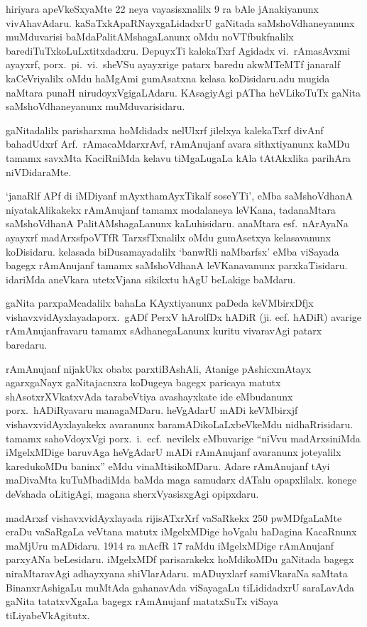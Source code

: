 hiriyara apeVkeSxyaMte {\rm 22} neya vayasisxnalilx {\rm 9} ra bAle jAnakiyanunx vivAha\-vAdaru. kaSaTxkApaRNayxgaLidadxrU gaNitada saMshoVdhaneyanunx muMduvarisi baMda\break PalitAMshagaLanunx oMdu noVTfbukfnalilx  barediTuTxkoLuLxtitxdadxru. DepuyxTi kalekaTxrf Agidadx vi.~rAmasAvxmi ayayxrf, porx.~pi.~vi.~sheVSu ayayxrige patarx baredu akwMTeMTf janaralf kaCeVriyalilx oMdu haMgAmi gumAsatxna kelasa koDisidaru.\break adu mugida naMtara punaH nirudoyxVgigaLAdaru. KAsagiyAgi pATha heVLikoTuTx gaNita saMshoVdhaneyanunx muMduvarisidaru.

gaNitadalilx parisharxma hoMdidadx nelUlxrf jilelxya kalekaTxrf divAnf bahadUdxrf\break 
Arf.~rAmacaMdarxrAvf, rAmAnujanf avara sithxtiyanunx kaMDu tamamx savxMta KaciRniMda kelavu tiMgaLugaLa kAla tAtAkxlika parihAra niVDidaraMte.

`janaRlf APf di iMDiyanf mAyxthamAyxTikalf soseYTi', eMba saMshoVdhanA niyatakAlikakekx rAmAnujanf tamamx modalaneya leVKana, tadanaMtara saMshoVdhanA PalitAMshagaLanunx kaLuhisidaru. anaMtara esf.~nArAyaNa ayayxrf madArxsf\break poVTfR TarxsfTxnalilx oMdu gumAsetxya kelasavanunx koDisidaru. kelasada biDusamaya\-dalilx `banwRli naMbarfsx' eMba viSayada bagegx rAmAnujanf tamamx saMshoVdhanA leVKanavanunx parxkaTisidaru. idariMda aneVkara utetxVjana sikikxtu hAgU beLakige baMdaru.

gaNita parxpaMcadalilx bahaLa KAyxtiyanunx paDeda keVMbirxDfjx vishavxvidAyxlayada\break porx.~gADf PerxV hArolfDx hADiR (ji. ecf. hADiR) avarige rAmAnujanfravaru tamamx sAdhanegaLanunx kuritu vivaravAgi patarx baredaru.

rAmAnujanf nijakUkx obabx parxtiBAshAli, Atanige pAshicxmAtayx agarxgaNayx gaNitajacnxra koDugeya bagegx paricaya matutx shAsotxrXVkatxvAda tarabeVtiya avashayxkate ide eMbudanunx porx.~hADiRyavaru managaMDaru. heVgAdarU mADi keVMbirxjf  vishavxvidAyxlayakekx avaranunx baramADikoLaLxbeVkeMdu nidhaRrisidaru. tamamx sahoVdoyxVgi porx.~i.~ecf.~nevilelx eMbuvarige ``niVvu madArxsiniMda iMgelxMDige baruvAga heVgAdarU mADi rAmAnujanf avaranunx joteyalilx karedukoMDu baninx'' eMdu vinaMtisikoMDaru. Adare rAmAnujanf tAyi maDivaMta kuTuMba\-diMda baMda maga samudarx dATalu opapxlilalx. konege deVshada oLitigAgi, magana sherxVyasisxgAgi opipxdaru.
\vskip 0.1cm

madArxsf vishavxvidAyxlayada rijisATxrXrf vaSaRkekx {\rm 250} pwMDfgaLaMte eraDu vaSaRgaLa veVtana matutx iMgelxMDige hoVgalu haDagina KacaRnunx maMjUru mADidaru.  {\rm 1914} ra mAcfR {\rm 17} raMdu iMgelxMDige rAmAnujanf parxyANa beLesidaru. iMgelxMDf parisarakekx hoMdikoMDu gaNitada bagegx niraMtaravAgi adhayxyana shiVlarAdaru. mADuyxlarf samiVkaraNa saMtata BinanxrAshigaLu muMtAda gahanavAda viSayagaLu tiLididadxrU saraLavAda gaNita tatatxvXgaLa bagegx rAmAnujanf matatxSuTx viSaya tiLiyabeVkAgitutx.
\vskip 0.1cm

